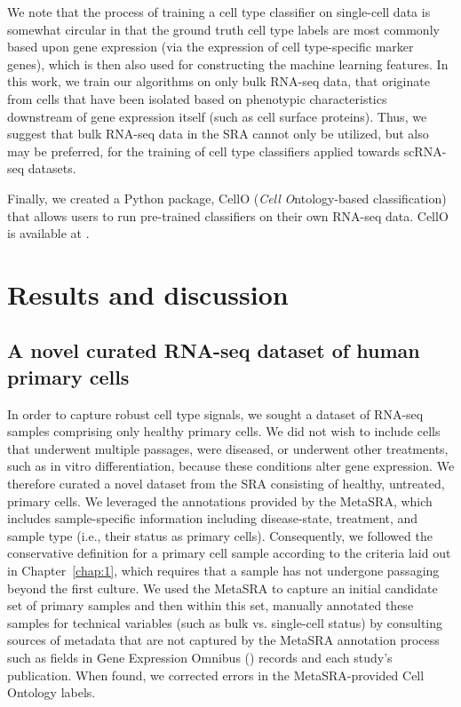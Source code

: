 We note that the process of training a cell type classifier on single-cell data is somewhat circular in that the ground truth cell type labels are most commonly based upon gene expression (via the expression of cell type-specific marker genes), which is then also used for constructing the machine learning features.  In this work, we train our algorithms on only bulk RNA-seq data, that originate from cells that have been isolated based on phenotypic characteristics downstream of gene expression itself (such as cell surface proteins). Thus, we suggest that bulk RNA-seq data in the SRA cannot only be utilized, but also may be preferred, for the training of cell type classifiers applied towards scRNA-seq datasets. 

Finally, we created a Python package, CellO (\textit{Cell} \textit{O}ntology-based classification) that allows users to run pre-trained classifiers on their own RNA-seq data. CellO is available at \ClassifierURL{}.

\section{Results and discussion}

\subsection*{A novel curated RNA-seq dataset of human primary cells}\label{sec:primary_cell_data}

In order to capture robust cell type signals, we sought a dataset of RNA-seq samples comprising only healthy primary cells. We did not wish to include cells that underwent multiple passages, were diseased, or underwent other treatments, such as in vitro differentiation, because these conditions alter gene expression. We therefore curated a novel dataset from the SRA consisting of healthy, untreated, primary cells.  We leveraged the annotations provided by the MetaSRA, which includes sample-specific information including disease-state, treatment, and sample type (i.e., their status as primary cells). Consequently, we followed the conservative definition for a primary cell sample according to the criteria laid out in Chapter~\ref{chap:1}, which requires that a sample has not undergone passaging beyond the first culture.  We used the MetaSRA to capture an initial candidate set of primary samples and then within this set, manually annotated these samples for technical variables (such as bulk vs. single-cell status) by consulting sources of metadata that are not captured by the MetaSRA annotation process such as fields in Gene Expression Omnibus (\citealp{Barrett2013}) records and each study's publication.  When found, we corrected errors in the MetaSRA-provided Cell Ontology labels. 

